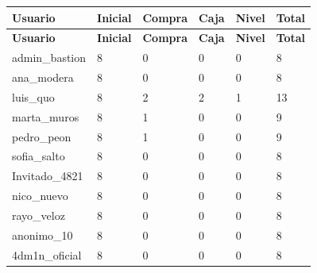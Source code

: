 \begin{center}\footnotesize\setlength{\tabcolsep}{2pt}
\begin{longtable}{|L{117.0pt}|L{69.4pt}|L{84.3pt}|L{53.3pt}|L{60.3pt}|L{60.3pt}|}
\hline
\textbf{\hspace{0pt}Usuario} & \textbf{\hspace{0pt}Inicial} & \textbf{\hspace{0pt}Compra} & \textbf{\hspace{0pt}Caja} & \textbf{\hspace{0pt}Nivel} & \textbf{\hspace{0pt}Total} \\ \hline
\endfirsthead
\hline
\textbf{\hspace{0pt}Usuario} & \textbf{\hspace{0pt}Inicial} & \textbf{\hspace{0pt}Compra} & \textbf{\hspace{0pt}Caja} & \textbf{\hspace{0pt}Nivel} & \textbf{\hspace{0pt}Total} \\ \hline
\endhead
admin\_\allowbreak{}bastion & 8 & 0 & 0 & 0 & 8 \\ \hline
ana\_\allowbreak{}modera & 8 & 0 & 0 & 0 & 8 \\ \hline
luis\_\allowbreak{}quo & 8 & 2 & 2 & 1 & 13 \\ \hline
marta\_\allowbreak{}muros & 8 & 1 & 0 & 0 & 9 \\ \hline
pedro\_\allowbreak{}peon & 8 & 1 & 0 & 0 & 9 \\ \hline
sofia\_\allowbreak{}salto & 8 & 0 & 0 & 0 & 8 \\ \hline
Invitado\_\allowbreak{}4821 & 8 & 0 & 0 & 0 & 8 \\ \hline
nico\_\allowbreak{}nuevo & 8 & 0 & 0 & 0 & 8 \\ \hline
rayo\_\allowbreak{}veloz & 8 & 0 & 0 & 0 & 8 \\ \hline
anonimo\_\allowbreak{}10 & 8 & 0 & 0 & 0 & 8 \\ \hline
4dm1n\_\allowbreak{}oficial & 8 & 0 & 0 & 0 & 8 \\ \hline
\end{longtable}
\end{center}
